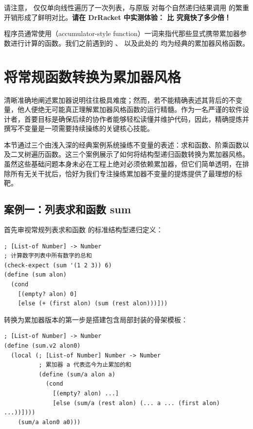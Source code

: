 请注意， 仅仅单向线性遍历了一次列表，与原版  对每个自然递归结果调用  的繁重开销形成了鲜明对比。\textbf{请在 DrRacket 中实测体验： 比  究竟快了多少倍！}

\begin{notebox}
程序员通常使用（accumulator-style function）一词来指代那些显式携带累加器参数进行计算的函数。我们之前遇到的 、 以及此处的  均为经典的累加器风格函数。
\end{notebox}

\section{将常规函数转换为累加器风格}
\label{sec:ch32_3}

清晰准确地阐述累加器说明往往极具难度；然而，若不能精确表述其背后的不变量，他人便绝无可能真正理解累加器风格函数的运行精髓。作为一名严谨的软件设计者，首要目标是确保后续的协作者能够轻松读懂并维护代码，因此，精确提炼并撰写不变量是一项需要持续操练的关键核心技能。

本节通过三个由浅入深的经典案例系统操练不变量的表述：求和函数、阶乘函数以及二叉树遍历函数。这三个案例展示了如何将结构型递归函数转换为累加器风格。虽然这些基础问题本身未必在工程上绝对必须依赖累加器，但它们简单透明，在排除所有无关干扰后，恰好为我们专注操练累加器不变量的提炼提供了最理想的标靶。

\subsection{案例一：列表求和函数 sum}

首先审视常规列表求和函数  的标准结构型递归定义：

\begin{lstlisting}[language=BSL]
; [List-of Number] -> Number
; 计算数字列表中所有数字的总和
(check-expect (sum '(1 2 3)) 6)
(define (sum alon)
  (cond
    [(empty? alon) 0]
    [else (+ (first alon) (sum (rest alon)))]))
\end{lstlisting}

转换为累加器版本的第一步是搭建包含局部封装的骨架模板：

\begin{lstlisting}[language=BSL]
; [List-of Number] -> Number
(define (sum.v2 alon0)
  (local (; [List-of Number] Number -> Number
          ; 累加器 a 代表迄今为止累加的和
          (define (sum/a alon a)
            (cond
              [(empty? alon) ...]
              [else (sum/a (rest alon) (... a ... (first alon) ...))])))
    (sum/a alon0 a0)))
\end{lstlisting}

